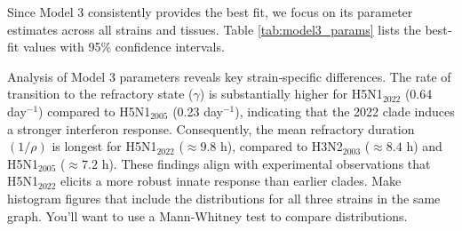 \documentclass[12pt]{article}
\begin{document}
Since Model 3 consistently provides the best fit, we focus on its parameter estimates across all strains and tissues. Table \ref{tab:model3_params} lists the best‐fit values with 95\% confidence intervals.
\begin{table}
\centering
\caption{Estimated parameter values for Model 3 (refractory state model) with 95\% confidence intervals. \color{red} Is this for nasal or tracheal?Include the other one as part of this table. You can put it below this one. \label{model3_params}}
\label{tab:model3_params}
\end{table}

Analysis of Model 3 parameters reveals key strain‐specific differences. The rate of transition to the refractory state (\(\gamma\)) is substantially higher for H5N1\(_{2022}\) (0.64 day\(^{-1}\)) compared to H5N1\(_{2005}\) (0.23 day\(^{-1}\)), indicating that the 2022 clade induces a stronger interferon response. Consequently, the mean refractory duration \(\left(1/\rho\right)\) is longest for H5N1\(_{2022}\) (\(\approx 9.8\) h), compared to H3N2\(_{2003}\) (\(\approx 8.4\) h) and H5N1\(_{2005}\) (\(\approx 7.2\) h). These findings align with experimental observations that H5N1\(_{2022}\) elicits a more robust innate response than earlier clades. \color{red} Make histogram figures that include the distributions for all three strains in the same graph. You'll want to use a Mann-Whitney test to compare distributions. \color{black} 
\end{document}
